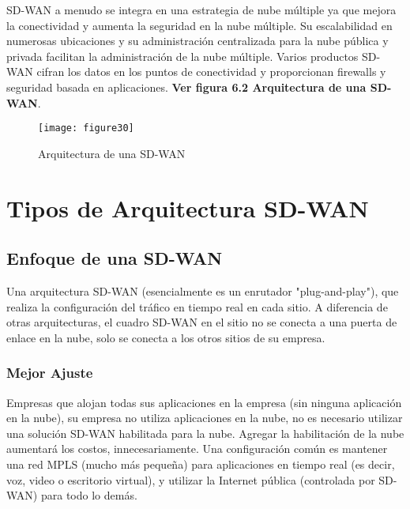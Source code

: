 SD-WAN a menudo se integra en una estrategia de nube múltiple ya que mejora la conectividad y aumenta la seguridad en la nube múltiple. Su escalabilidad en numerosas ubicaciones y su administración centralizada para la nube pública y privada facilitan la administración de la nube múltiple. Varios productos SD-WAN cifran los datos en los puntos de conectividad y proporcionan firewalls y seguridad basada en aplicaciones.
\textbf{Ver figura 6.2 Arquitectura de una SD-WAN}.

\begin{figure}[htbp]
  \centering
    {\texttt{[image: figure30]}}%
  \caption{Arquitectura de una SD-WAN}
  \label{fig:fig2subfig}
\end{figure}


\section{Tipos de Arquitectura SD-WAN}
\label{sec:Tipos de Arquitectura SD-WAN}

\subsection{Enfoque de una SD-WAN}
\label{sec:Enfoque de una SD-WAN}

Una arquitectura SD-WAN (esencialmente es un enrutador "plug-and-play"), que realiza
la configuración del tráfico en tiempo real en cada sitio. A diferencia de otras arquitecturas, el cuadro SD-WAN en el sitio no se conecta a una puerta de enlace en la nube, solo se conecta a los otros sitios de su empresa.

\subsubsection{Mejor Ajuste}
\label{sec:Mejor Ajuste}

Empresas que alojan todas sus aplicaciones en la empresa (sin ninguna aplicación en la nube), su empresa no utiliza aplicaciones en la nube, no es necesario utilizar una solución SD-WAN habilitada para la nube. Agregar la habilitación de la nube aumentará los costos, innecesariamente. Una configuración común es mantener una red MPLS (mucho más pequeña) para aplicaciones en tiempo real (es decir, voz, video o escritorio virtual), y utilizar la Internet pública (controlada por SD-WAN) para todo lo demás.

